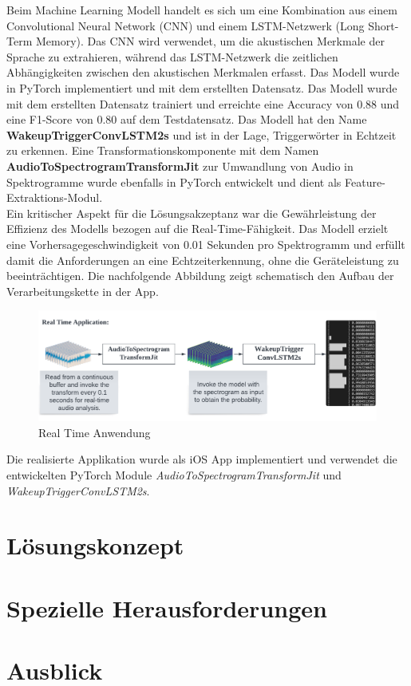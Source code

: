 \documentclass[11pt,a4paper]{article}
\begin{document}
\noindent
Beim Machine Learning Modell handelt es sich um eine Kombination aus einem Convolutional Neural Network (CNN) und einem LSTM-Netzwerk (Long Short-Term Memory). Das CNN wird verwendet, um die akustischen Merkmale der Sprache zu extrahieren, während das LSTM-Netzwerk die zeitlichen Abhängigkeiten zwischen den akustischen Merkmalen erfasst. Das Modell wurde in PyTorch implementiert und mit dem erstellten Datensatz. Das Modell wurde mit dem erstellten Datensatz trainiert und erreichte eine Accuracy von 0.88 und eine F1-Score von 0.80 auf dem Testdatensatz. Das Modell hat den Name \textbf{WakeupTriggerConvLSTM2s} und ist in der Lage, Triggerwörter in Echtzeit zu erkennen. Eine Transformationskomponente mit dem Namen \textbf{AudioToSpectrogramTransformJit} zur Umwandlung von Audio in Spektrogramme wurde ebenfalls in PyTorch entwickelt und dient als Feature-Extraktions-Modul. \\

\noindent
Ein kritischer Aspekt für die Lösungsakzeptanz war die Gewährleistung der Effizienz des Modells bezogen auf die Real-Time-Fähigkeit. Das Modell erzielt eine Vorhersagegeschwindigkeit von 0.01 Sekunden pro Spektrogramm und erfüllt damit die Anforderungen an eine Echtzeiterkennung, ohne die Geräteleistung zu beeinträchtigen. Die nachfolgende Abbildung zeigt schematisch den Aufbau der Verarbeitungskette in der App.\\

\begin{figure}[H]
	\centering
	\includegraphics[width=0.8\linewidth, trim=0pt 10pt 0pt 15pt, clip]{img/realtime-application.pdf}
	\caption{Real Time Anwendung}
\end{figure}

\noindent
Die realisierte Applikation wurde als iOS App implementiert und verwendet die entwickelten PyTorch Module \textit{AudioToSpectrogramTransformJit} und \textit{WakeupTriggerConvLSTM2s}.





\section{Lösungskonzept}


\section{Spezielle Herausforderungen}


\section{Ausblick}
\end{document}
